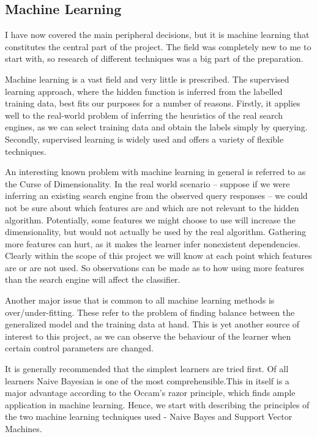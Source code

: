 \documentclass[12pt,twoside,notitlepage]{report}
\begin{document}
\subsection{Machine Learning}

I have now covered the main peripheral decisions, but it is machine learning that
constitutes the central part of the project. The field was completely new to me
to start with, so research of different techniques was a big part of the
preparation.

Machine learning is a vast field and very little is prescribed.
The supervised learning approach, where the hidden function is
inferred from the labelled training data, best fits our purposes for a number
of reasons. Firstly, it applies well to the real-world problem of inferring the
heuristics of the real search engines, as we can select training data and
obtain the labels simply by querying. Secondly, supervised learning is widely
used and offers a variety of flexible techniques.

An interesting known problem with machine learning in general is referred to as
the Curse of Dimensionality. In the real world scenario -- suppose if we were
inferring an existing search engine from the observed query responses -- we
could not be sure about which features are and which are not relevant to the
hidden algorithm. Potentially, some features we might choose to use will
increase the dimensionality, but would not actually be used by the real
algorithm. Gathering more features can hurt, as it makes the learner infer
nonexistent dependencies. Clearly within the scope of this project we will know
at each point which features are or are not used. So observations can be made
as to how using more features than the search engine will affect the
classifier.

Another major issue that is common to all machine learning methods is
over/under-fitting. These refer to the problem of finding balance between the
generalized model and the training data at hand. This is yet another source of
interest to this project, as we can observe the behaviour of the learner when
certain control parameters are changed.

It is generally recommended that the simplest learners are tried
first\cite{domingos}. Of all learners Naive Bayesian is one of the most
comprehensible.This in itself is a major advantage according to the Occam's
razor principle, which finds ample application in machine learning.
Hence, we start with describing the principles of the two machine learning
techniques used - Naive Bayes and Support Vector Machines.
\end{document}
